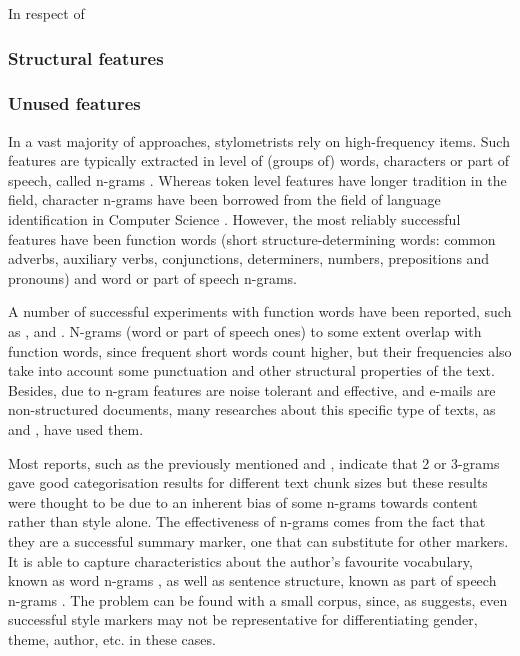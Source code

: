 In respect of

\subsubsection{Structural features}\label{sssect:strucf}

\subsubsection{Unused features}\label{sssect:unusedf}

In a vast majority of approaches, stylometrists rely on high-frequency items. Such features are typically extracted in level of (groups of) words, characters or part of speech, called n-grams \citep{kjell1994discrimination}. Whereas token level features have longer tradition in the field, character n-grams have been borrowed from the field of language identification in Computer Science \citep{stamatatos2009survey, eder2011style}. However, the most reliably successful features have been function words (short structure-determining words: common adverbs, auxiliary verbs, conjunctions, determiners, numbers, prepositions and pronouns) and word or part of speech n-grams. 

A number of successful experiments with function words have been reported, such as \cite{craig1999authorial}, \cite{koppel2006feature} and \cite{de2001mining}. N-grams (word or part of speech ones) to some extent overlap with function words, since frequent short words count higher, but their frequencies also take into account some punctuation and other structural properties of the text. Besides, due to n-gram features are noise tolerant and effective, and e-mails are non-structured documents, many researches about this specific type of texts, as \cite{brocardo2013authorship} and \cite{corney2001identifying}, have used them.

Most reports, such as the previously mentioned \cite{kjell1994discrimination} and \cite{corney2001identifying}, indicate that 2 or 3-grams gave good categorisation results for different text chunk sizes but these results were thought to be due to an inherent bias of some n-grams towards content rather than style alone. The effectiveness of n-grams comes from the fact that they are a successful summary marker, one that can substitute for other markers. It is able to capture characteristics about the author's favourite vocabulary, known as word n-grams \citep{diederich2003authorship}, as well as sentence structure, known as part of speech n-grams \citep{baayen1996outside, argamon1998routing}. The problem can be found with a small corpus, since, as \cite{baayen2000back} suggests, even successful style markers may not be representative for differentiating gender, theme, author, etc. in these cases.

